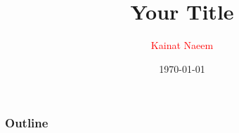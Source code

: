 \documentclass{beamer} %
\title[\textcolor{red}{Short Title}]{\textbf{Your Title}}
\author[\textcolor{white}{Kainat Naeem}]{{\Large\textcolor{red}{Kainat Naeem}}}
\institute[\textcolor{white}{Short University Name}]{
Your Department Name\\
Your Faculty Name\\
Your Institute Name}
\date{\today}
\begin{document}
\begin{frame}
  \titlepage
\end{frame}


\begin{frame}\frametitle{Outline}
  \tableofcontents[hideallsubsections]

\end{frame}
\end{document}
